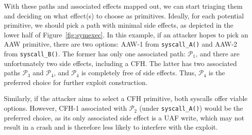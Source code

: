 


With these paths and associated effects mapped out, we can start triaging them and deciding on what effect(s) to choose as primitives. Ideally, for each potential primitive, we should pick a path with minimal side effects, as depicted in the lower half of Figure~\ref{fig:symexec}. In this example, if an attacker hopes to pick an AAW primitive, there are two options: AAW-1 from \texttt{syscall\_A()} and AAW-2 from \texttt{syscall\_B()}. The former has only one associated path: $\mathcal{P}_1$, and there are unfortunately two side effects, including a CFH. The latter has two associated paths $\mathcal{P}_3$ and $\mathcal{P}_4$, and $\mathcal{P}_4$ is completely free of side effects. Thus, $\mathcal{P}_4$ is the preferred choice for further exploit construction.

Similarly, if the attacker aims to select a CFH primitive, both syscalls offer viable options. However, CFH-1 associated with $\mathcal{P}_2$ (under \texttt{syscall\_A()}) would be the preferred choice, as its only associated side effect is a UAF write, which may not result in a crash and is therefore less likely to interfere with the exploit.


